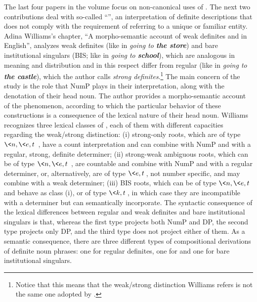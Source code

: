 \documentclass[output=paper]{langsci/langscibook}
\begin{document}
The last four papers in the volume focus on non-canonical uses of . The next two contributions deal with so-called “”, an interpretation of definite descriptions that does not comply with the requirement of referring to a unique or familiar entity.  Adina Williams’s chapter, “A morpho-semantic account of weak definites and  in English”, analyzes  weak definites (like in \textit{going to \textbf{the store}}) and bare institutional singulars (BIS; like in \textit{going to \textbf{school}}), which are analogous in meaning and distribution and in this respect differ from regular  (like in \textit{going to \textbf{the castle}}), which the author calls \textit{strong definites}.\footnote{Notice that this means that the weak/strong distinction Williams refers  is not the same one adopted by \citet{Schwarz2009}.}  The main concern of the study is the role that NumP plays in their interpretation, along with the denotation of their head noun. The author provides a morpho-semantic account of the phenomenon, according to which the particular behavior of these constructions is a consequence of the lexical nature of their head noun. Williams recognizes three lexical classes of , each of them with different capacities regarding the weak/strong distinction: (i) strong-only roots, which are of type $ \<n, \<e, t\>\>$, have a count interpretation and can combine with NumP and with a regular, strong, definite determiner; (ii) strong-weak ambiguous roots, which can be of type $ \<n, \<e, t\>\>$, are countable and combine with NumP and with a regular determiner, or, alternatively, are of type $ \<e, t\>$, not number specific, and may combine with a weak determiner; (iii) BIS roots, which can be of type $ \<n, \<e, t\> \>$ and behave as class (i), or of type $ \<k, t\>$, in which case they are incompatible with a determiner but can semantically incorporate. The syntactic consequence of the lexical differences between regular and weak definites and bare institutional singulars is that, whereas the first type projects both NumP and DP, the second type projects only DP, and the third type does not project either of them. As a semantic consequence, there are three different types of compositional derivations of definite noun phrases: one for regular definites, one for  and one for bare institutional singulars.
\end{document}

